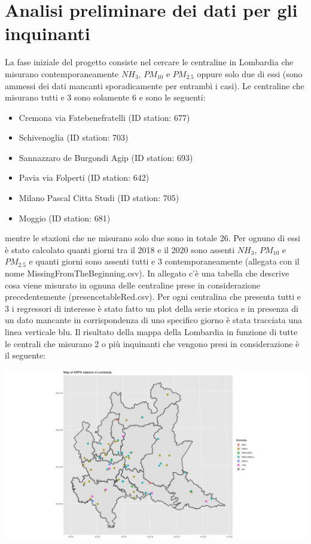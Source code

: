 \documentclass{article}
\begin{document}
\section{Analisi preliminare dei dati per gli inquinanti}
La fase iniziale del progetto consiste nel cercare le centraline in Lombardia
che misurano contemporaneamente $NH_{3}$, $PM_{10}$ e $PM_{2.5}$ oppure solo due di essi
(sono ammessi dei dati mancanti sporadicamente per entrambi i casi).
Le centraline che misurano tutti e 3 sono solamente 6 e sono le seguenti:
\begin{itemize}
    \item Cremona via Fatebenefratelli (ID station: 677)
    \item Schivenoglia (ID station: 703)
    \item Sannazzaro de Burgondi Agip (ID station: 693)
    \item Pavia via Folperti (ID station: 642)
    \item Milano Pascal Citta Studi (ID station: 705)
    \item Moggio (ID station: 681)
\end{itemize}
mentre le stazioni che ne misurano solo due sono in totale 26.
Per ognuno di essi è stato calcolato quanti giorni tra il 2018 e il 2020 sono assenti
$NH_{3}$, $PM_{10}$ e $PM_{2.5}$ e quanti giorni sono assenti tutti e 3 contemporaneamente
(allegata con il nome MissingFromTheBeginning.csv).
In allegato c'è una tabella che descrive cosa viene misurato in ognuna
delle centraline prese in considerazione precedentemente (presencetableRed.csv).
Per ogni centralina che presenta tutti e 3 i regressori di interesse è stato fatto
un plot della serie storica e in presenza di un dato mancante in corrispondenza
di uno specifico giorno è stata tracciata una linea verticale blu.
Il risultato della mappa della Lombardia in funzione di tutte le centrali che misurano 2 o più inquinanti che 
vengono presi in considerazione è il seguente:

\includegraphics[scale=0.35]{mappina.jpeg}
\end{document}
